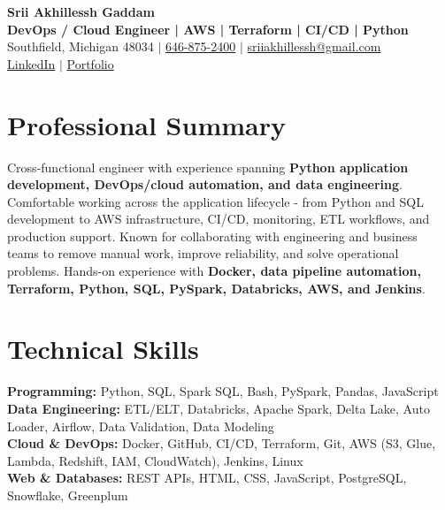 \documentclass[letterpaper,10pt]{article}
\begin{document}
\fontsize{9.35pt}{10.45pt}\selectfont

\begin{center}
    {\LARGE \textbf{Srii Akhillessh Gaddam}} \\[-1pt]
    \textbf{DevOps / Cloud Engineer | AWS | Terraform | CI/CD | Python} \\[2pt]
    Southfield, Michigan 48034 $|$
    \href{tel:6468752400}{646-875-2400} $|$
    \href{mailto:sriiakhillessh@gmail.com}{sriiakhillessh@gmail.com} \\[1pt]
    \href{https://www.linkedin.com/in/srii-akhiilessh-gaddam-b48668191/}{LinkedIn} $|$
    \href{https://sriiakhillesshg.github.io/portfolio/}{Portfolio}
\end{center}
\vspace{-8pt}

\section{Professional Summary}
\small{Cross-functional engineer with experience spanning \textbf{Python application development, DevOps/cloud automation, and data engineering}. Comfortable working across the application lifecycle - from Python and SQL development to AWS infrastructure, CI/CD, monitoring, ETL workflows, and production support. Known for collaborating with engineering and business teams to remove manual work, improve reliability, and solve operational problems. Hands-on experience with \textbf{Docker, data pipeline automation, Terraform, Python, SQL, PySpark, Databricks, AWS, and Jenkins}.}

\section{Technical Skills}
\small{
\textbf{Programming:} Python, SQL, Spark SQL, Bash, PySpark, Pandas, JavaScript \\
\textbf{Data Engineering:} ETL/ELT, Databricks, Apache Spark, Delta Lake, Auto Loader, Airflow, Data Validation, Data Modeling \\
\textbf{Cloud \& DevOps:} Docker, GitHub, CI/CD, Terraform, Git, AWS (S3, Glue, Lambda, Redshift, IAM, CloudWatch), Jenkins, Linux \\
\textbf{Web \& Databases:} REST APIs, HTML, CSS, JavaScript, PostgreSQL, Snowflake, Greenplum
}
\end{document}
